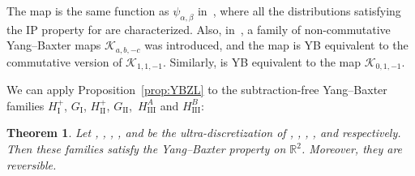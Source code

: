 \documentclass[pdftex]{sigma}
\numberwithin{equation}{section}
\newtheorem{Theorem}{Theorem}[section]
\begin{document}
\begin{Remark}
The map  is the same function as
$\psi_{\alpha,\beta}$ in~\cite{KW2}, where all the distributions satisfying the IP property for  are characterized. Also, in~\cite{KK}, a family of non-commutative Yang--Baxter maps $\mathcal{K}_{a,b,-c}$ was introduced, and the map 
is YB equivalent to the commutative
version of $\mathcal{K}_{1,1,-1}$. Similarly,  is YB equivalent to the map $\mathcal{K}_{0,1,-1}$.
\end{Remark}

We can apply Proposition~\ref{prop:YBZL} to
the subtraction-free Yang--Baxter families
$H_{\mathrm{I}}^+$, $G_{\mathrm{I}}$,
$H_{\mathrm{II}}^+$, $G_{\mathrm{II}}$,~$H_{\mathrm{III}}^A$ and $H_{\mathrm{III}}^B$:


\begin{Theorem}\label{thm:ZT quad maps}
Let , ,
, ,  and  be
the ultra-discretization of
, ,
, ,  and  respectively.
Then these families satisfy the Yang--Baxter property on $\mathbb{R}^2$. Moreover, they are reversible.
\end{Theorem}
\end{document}
